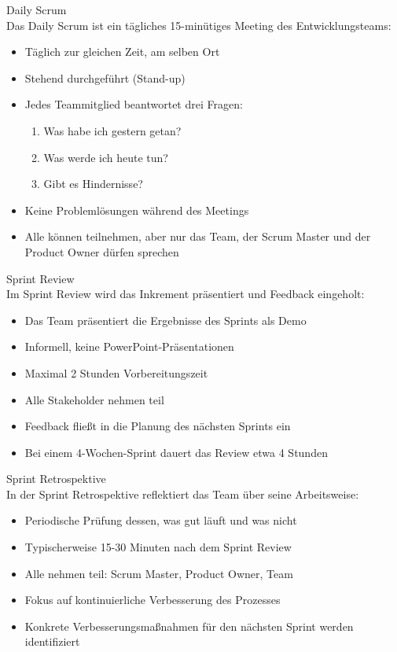 \begin{definition}{Daily Scrum}\\
    Das Daily Scrum ist ein tägliches 15-minütiges Meeting des Entwicklungsteams:
    \begin{itemize}
        \item Täglich zur gleichen Zeit, am selben Ort
        \item Stehend durchgeführt (Stand-up)
        \item Jedes Teammitglied beantwortet drei Fragen:
        \begin{enumerate}
            \item Was habe ich gestern getan?
            \item Was werde ich heute tun?
            \item Gibt es Hindernisse?
        \end{enumerate}
        \item Keine Problemlösungen während des Meetings
        \item Alle können teilnehmen, aber nur das Team, der Scrum Master und der Product Owner dürfen sprechen
    \end{itemize}
\end{definition}

\begin{definition}{Sprint Review}\\
    Im Sprint Review wird das Inkrement präsentiert und Feedback eingeholt:
    \begin{itemize}
        \item Das Team präsentiert die Ergebnisse des Sprints als Demo
        \item Informell, keine PowerPoint-Präsentationen
        \item Maximal 2 Stunden Vorbereitungszeit
        \item Alle Stakeholder nehmen teil
        \item Feedback fließt in die Planung des nächsten Sprints ein
        \item Bei einem 4-Wochen-Sprint dauert das Review etwa 4 Stunden
    \end{itemize}
\end{definition}

\begin{definition}{Sprint Retrospektive}\\
    In der Sprint Retrospektive reflektiert das Team über seine Arbeitsweise:
    \begin{itemize}
        \item Periodische Prüfung dessen, was gut läuft und was nicht
        \item Typischerweise 15-30 Minuten nach dem Sprint Review
        \item Alle nehmen teil: Scrum Master, Product Owner, Team
        \item Fokus auf kontinuierliche Verbesserung des Prozesses
        \item Konkrete Verbesserungsmaßnahmen für den nächsten Sprint werden identifiziert
    \end{itemize}
\end{definition}


